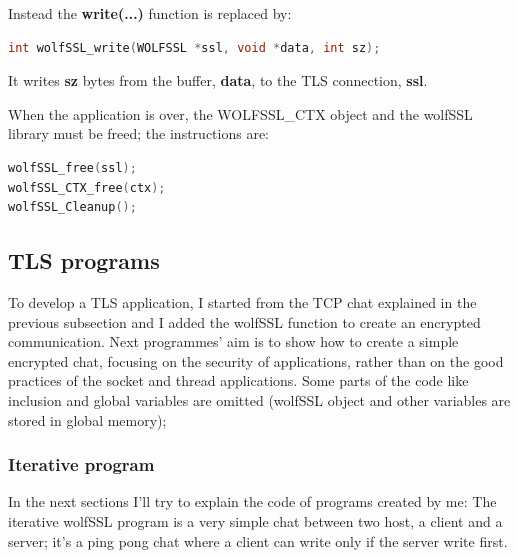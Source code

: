 \documentclass[a4paper,12pt]{article}
\begin{document}
Instead the \textbf{write(...)} function is replaced by:
\begin{lstlisting}[language=c]
int wolfSSL_write(WOLFSSL *ssl, void *data, int sz);
\end{lstlisting}
It writes \textbf{sz} bytes from the buffer, \textbf{data}, to the TLS connection, \textbf{ssl}.

When the application is over, the WOLFSSL\_CTX object and the wolfSSL library must be freed; the instructions are:
\begin{lstlisting}[language=c]
wolfSSL_free(ssl);
wolfSSL_CTX_free(ctx);
wolfSSL_Cleanup();
\end{lstlisting}


\subsection{TLS programs}
To develop a TLS application, I started from the TCP chat explained in the previous subsection and I added the wolfSSL function to create an encrypted communication.
Next programmes' aim is to show how to create a simple encrypted chat, focusing on the security of applications, rather than on the good practices of the socket and thread applications.
Some parts of the code like inclusion and global variables are omitted (wolfSSL object and other variables are stored in global memory); 
\subsubsection{Iterative program}
In the next sections I'll try to explain the code of programs created by me:
The iterative wolfSSL program is a very simple chat between two host, a client and a server; it's a ping pong chat where a client can write only if the server write first.
\end{document}
